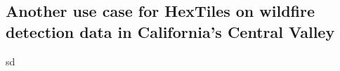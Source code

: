 \subsection{Another use case for HexTiles on wildfire detection data in California's Central Valley}

sd